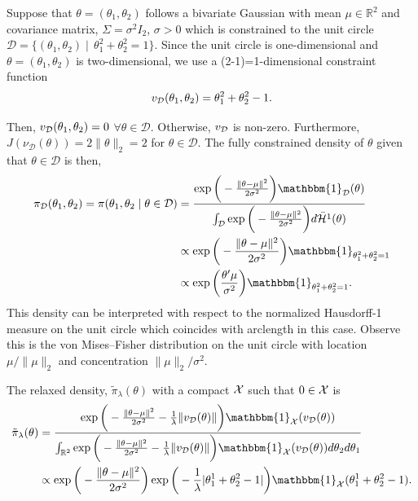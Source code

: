 \documentclass[10pt,fleqn]{article} \pdfoutput=1
\DeclareMathOperator{\1}{\mathbbm{1}} \DeclareMathOperator{\bigO}{\mc O}
\begin{document}
Suppose
that $\theta = (\theta_1,\theta_2)$ follows a bivariate Gaussian with mean
$\mu \in\mathbb{R}^2$ and covariance matrix, $\Sigma = \sigma^2 I_2$,
$\sigma > 0$ which is constrained to the unit circle $\mathcal{D} =
	\{(\theta_1,\theta_2) \mid \, \theta_1^2+\theta_2^2 = 1\}.$  Since the unit
circle is one-dimensional and $\theta = (\theta_1,\theta_2)$ is
two-dimensional, we use a (2-1)=1-dimensional constraint function
$$v_{\mathcal{D}}(\theta_1,\theta_2) = \theta_1^2+\theta_2^2 -1.$$

Then,
$v_{\mathcal{D}}(\theta_1,\theta_2) = 0$ $\forall \theta\in\mathcal{D}$. Otherwise,
$v_{\mathcal{D}}$ is non-zero.  Furthermore, $J(\nu_\mathcal{D}(\theta)) =
	2\|\theta\|_2 = 2$ for $\theta\in\mathcal{D}.$ The fully constrained
density of $\theta$ given that $\theta\in \mathcal{D}$ is then,
\begin{align*} \pi_\mathcal{D}(\theta_1,\theta_2)=
	\pi(\theta_1,\theta_2\mid \theta\in\mathcal{D}) & =
	\frac{\exp\bigg(-\frac{\|\theta-\mu\|^2}{2\sigma^2}\bigg)\mathbbm{1}_\mathcal{D}(\theta)}{\int_\mathcal{D}
		\exp\bigg(-\frac{\|\theta-\mu\|^2}{2\sigma^2}\bigg)d\bar{\mathcal{H}}^{1}(\theta)
	}                                               \\ &\propto \exp\bigg(-\frac{\|\theta-\mu\|^2}{2\sigma^2}\bigg)
	\mathbbm{1}_{\theta_1^2 + \theta_2^2 = 1} 
	\\ &\propto \exp\bigg( \frac{\theta'\mu}{\sigma^2}\bigg)
	\mathbbm{1}_{\theta_1^2 + \theta_2^2 = 1}
.\end{align*} 
This density
can be interpreted with respect to the normalized Hausdorff-1 measure on
the unit circle which coincides with arclength in this case. Observe this is the von Mises--Fisher distribution on the unit circle
with location $\mu /\|\mu\|_2$ and concentration $\|\mu\|_2/\sigma^2$.

The relaxed density, $\tilde{\pi}_\lambda(\theta)$ with a
compact $\mathcal{X}$ such that $0\in \mathcal{X}$ is
\begin{equation} \begin{split} \tilde{\pi}_\lambda(\theta)
		&=\frac{\exp\bigg(-\frac{\|\theta-\mu\|^2}{2\sigma^2} -
			\frac{1}{\lambda}\|v_{\mc D}(\theta)\| \bigg)   
			\mathbbm{1}_{\mc X}(v_{\mc D}(\theta))
			}{\int_{\mathbb{R}^2}
			\exp\bigg(-\frac{\|\theta-\mu\|^2}{2\sigma^2}-\frac{1}{\lambda}\|v_{\mc D}(\theta)\|
		\bigg)  \mathbbm{1}_{\mc X}(v_{\mc D}(\theta))    d\theta_2d\theta_1}
			\\ & \propto
		\exp\bigg(-\frac{\|\theta-\mu\|^2}{2\sigma^2}\bigg)\exp\bigg( -
		\frac{1}{\lambda}|\theta_1^1+\theta_2^2-1| \bigg)  \mathbbm{1}_{\mc X}(\theta_1^1+\theta_2^2-1).  \end{split}
	\label{EQ:Relaxed_Density_Bivariate_Unit_Circle} \end{equation}
\end{document}
